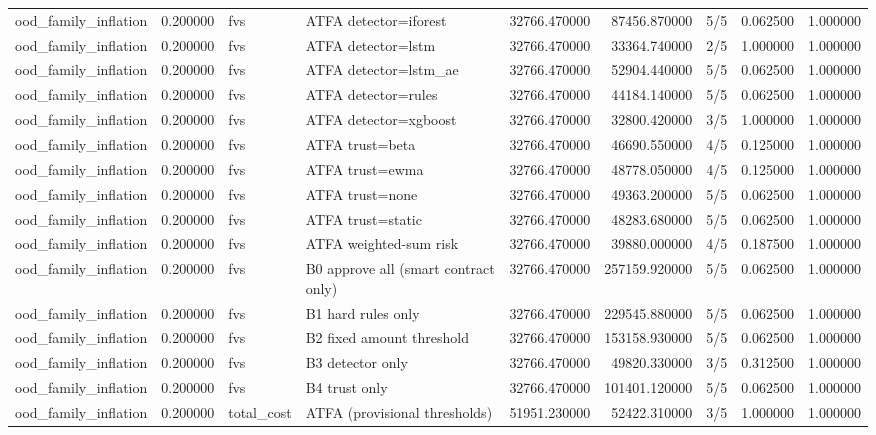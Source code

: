 \begin{tabular}{lrllrrlrr}
ood\_family\_inflation & 0.200000 & fvs & ATFA detector=iforest & 32766.470000 & 87456.870000 & 5/5 & 0.062500 & 1.000000 \\
ood\_family\_inflation & 0.200000 & fvs & ATFA detector=lstm & 32766.470000 & 33364.740000 & 2/5 & 1.000000 & 1.000000 \\
ood\_family\_inflation & 0.200000 & fvs & ATFA detector=lstm\_ae & 32766.470000 & 52904.440000 & 5/5 & 0.062500 & 1.000000 \\
ood\_family\_inflation & 0.200000 & fvs & ATFA detector=rules & 32766.470000 & 44184.140000 & 5/5 & 0.062500 & 1.000000 \\
ood\_family\_inflation & 0.200000 & fvs & ATFA detector=xgboost & 32766.470000 & 32800.420000 & 3/5 & 1.000000 & 1.000000 \\
ood\_family\_inflation & 0.200000 & fvs & ATFA trust=beta & 32766.470000 & 46690.550000 & 4/5 & 0.125000 & 1.000000 \\
ood\_family\_inflation & 0.200000 & fvs & ATFA trust=ewma & 32766.470000 & 48778.050000 & 4/5 & 0.125000 & 1.000000 \\
ood\_family\_inflation & 0.200000 & fvs & ATFA trust=none & 32766.470000 & 49363.200000 & 5/5 & 0.062500 & 1.000000 \\
ood\_family\_inflation & 0.200000 & fvs & ATFA trust=static & 32766.470000 & 48283.680000 & 5/5 & 0.062500 & 1.000000 \\
ood\_family\_inflation & 0.200000 & fvs & ATFA weighted-sum risk & 32766.470000 & 39880.000000 & 4/5 & 0.187500 & 1.000000 \\
ood\_family\_inflation & 0.200000 & fvs & B0 approve all (smart contract only) & 32766.470000 & 257159.920000 & 5/5 & 0.062500 & 1.000000 \\
ood\_family\_inflation & 0.200000 & fvs & B1 hard rules only & 32766.470000 & 229545.880000 & 5/5 & 0.062500 & 1.000000 \\
ood\_family\_inflation & 0.200000 & fvs & B2 fixed amount threshold & 32766.470000 & 153158.930000 & 5/5 & 0.062500 & 1.000000 \\
ood\_family\_inflation & 0.200000 & fvs & B3 detector only & 32766.470000 & 49820.330000 & 3/5 & 0.312500 & 1.000000 \\
ood\_family\_inflation & 0.200000 & fvs & B4 trust only & 32766.470000 & 101401.120000 & 5/5 & 0.062500 & 1.000000 \\
ood\_family\_inflation & 0.200000 & total\_cost & ATFA (provisional thresholds) & 51951.230000 & 52422.310000 & 3/5 & 1.000000 & 1.000000 \\

\end{tabular}
